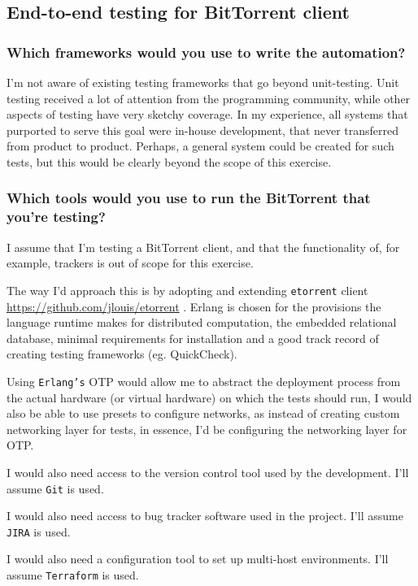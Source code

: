 \documentclass[11pt]{article}
\begin{document}
\subsection{End-to-end testing for BitTorrent client}
\label{sec:org68fef3a}
\subsubsection{Which frameworks would you use to write the automation?}
\label{sec:org6f25a94}
I'm not aware of existing testing frameworks that go beyond
unit-testing.  Unit testing received a lot of attention from the
programming community, while other aspects of testing have very
sketchy coverage.  In my experience, all systems that purported to
serve this goal were in-house development, that never transferred
from product to product.  Perhaps, a general system could be
created for such tests, but this would be clearly beyond the scope
of this exercise.

\subsubsection{Which tools would you use to run the BitTorrent that you're testing?}
\label{sec:orgebd937f}
I assume that I'm testing a BitTorrent client, and that the
functionality of, for example, trackers is out of scope for this
exercise.

The way I'd approach this is by adopting and extending \texttt{etorrent}
client \url{https://github.com/jlouis/etorrent} .  Erlang is chosen for
the provisions the language runtime makes for distributed
computation, the embedded relational database, minimal
requirements for installation and a good track record of creating
testing frameworks (eg. QuickCheck).

Using \texttt{Erlang's} OTP would allow me to abstract the deployment
process from the actual hardware (or virtual hardware) on which
the tests should run, I would also be able to use presets to
configure networks, as instead of creating custom networking layer
for tests, in essence, I'd be configuring the networking layer for
OTP.

I would also need access to the version control tool used by the
development.  I'll assume \texttt{Git} is used.

I would also need access to bug tracker software used in the
project.  I'll assume \texttt{JIRA} is used.

I would also need a configuration tool to set up multi-host
environments.  I'll assume \texttt{Terraform} is used.
\end{document}

